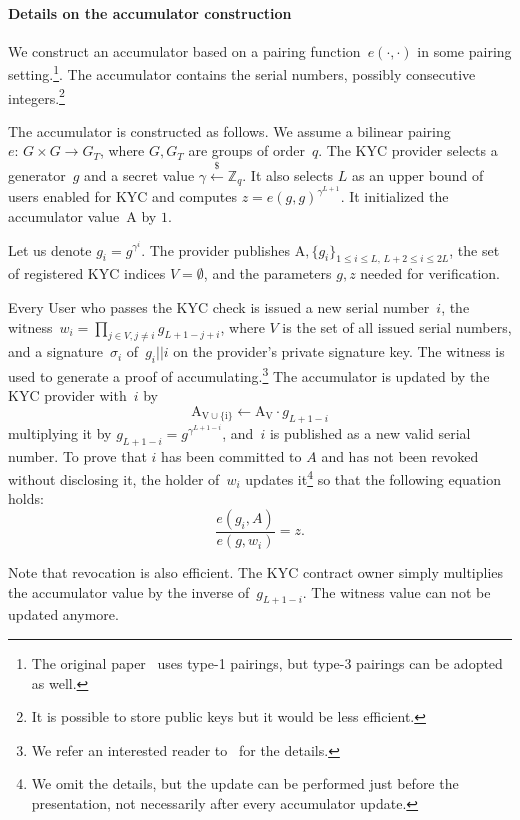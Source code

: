 \paragraph{Details on the accumulator construction}
We construct an accumulator based on a pairing function~$e(\cdot,\cdot)$ in some pairing setting.\footnote{The original paper~\cite{Camenisch2009} uses type-1 pairings, but type-3 pairings can be adopted as well.}.
The accumulator contains the serial numbers, possibly consecutive integers.\footnote{It is possible to store public keys but it would be less efficient.}

The accumulator is constructed as follows.
We assume a bilinear pairing~$e:\,G\times G\rightarrow G_T$, where $G,G_T$ are groups of order~$q$.
The KYC provider selects a generator~$g$ and a secret value $\gamma\overset{\$}{\leftarrow} \mathbb{Z}_q$.
It also selects $L$ as an upper bound of users enabled for KYC and computes $z = e(g,g)^{\gamma^{L+1}}$.
It initialized the accumulator value~$\mathrm{A}$ by $1$. 

Let us denote $g_i = g^{\gamma^i}$.
The provider publishes $\mathrm{A},\{g_i\}_{1\leq i\leq L, \,L+2\leq i \leq 2L}$, the set of registered KYC indices $V=\emptyset$, and the parameters $g,z$ needed for verification.

Every User who passes the KYC check is issued a new serial number~$i$, the witness~$w_i = \prod_{j\in V,j\neq i} g_{L+1-j+i}$, where $V$ is the set of all issued serial numbers, and a signature~$\sigma_i$ of~$g_i||i$ on the provider's private signature key.
The witness is used to generate a proof of accumulating.\footnote{We refer an interested reader to~\cite{Camenisch2009} for the details.}
The accumulator is updated by the KYC provider with~$i$ by
$$
\mathrm{A_{V\cup\{i\}}} \leftarrow \mathrm{A_V} \cdot g_{L+1-i}
$$
multiplying it by $g_{L+1-i} = g^{\gamma^{L+1-i}}$, and~$i$ is published as a new valid serial number.
To prove that $i$ has been committed to $A$ and has not been revoked without disclosing it, the holder of~$w_i$ updates it\footnote{We omit the details, but the update can be performed just before the presentation, not necessarily after every accumulator update.} so that the following equation holds:
$$
\frac{e(g_i, A)}{e(g,w_i)} = z.
$$

Note that revocation is also efficient.
The KYC contract owner simply multiplies the accumulator value by the inverse of~$g_{L+1-i}$.
The witness value can not be updated anymore.

